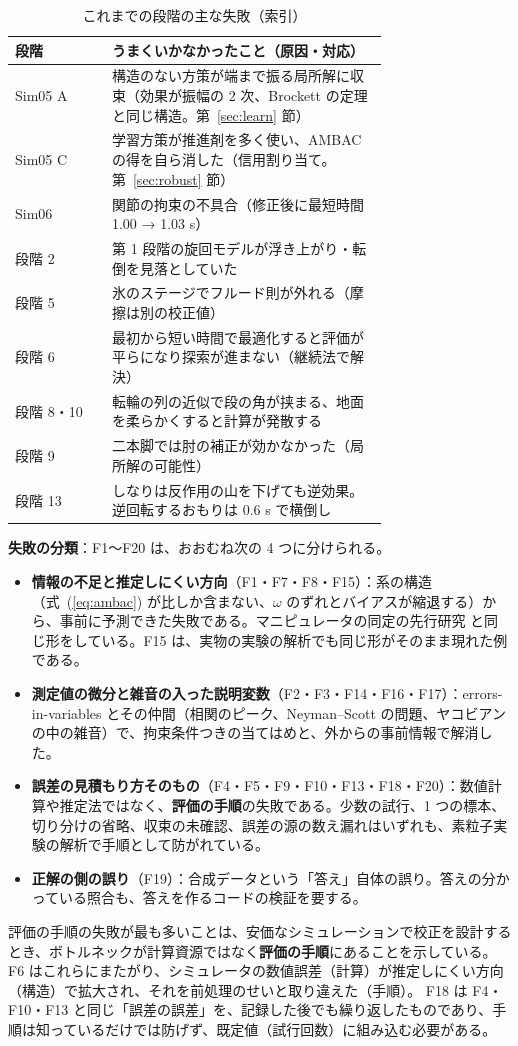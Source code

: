 \documentclass[paper=a4paper,fontsize=10pt,twocolumn,column_gap=2zw,line_length=24zw,number_of_lines=46,head_space=20mm]{jlreq}
\begin{document}
\begin{table}[t]\centering\footnotesize
\caption{これまでの段階の主な失敗（索引）}\label{tab:failidx}
\setlength{\tabcolsep}{2pt}
\begin{tabular}{lp{0.74\linewidth}}\toprule
段階 & うまくいかなかったこと（原因・対応） \\\midrule
Sim05 A & 構造のない方策が端まで振る局所解に収束（効果が振幅の 2 次、Brockett の定理と同じ構造。第~\ref{sec:learn} 節） \\
Sim05 C & 学習方策が推進剤を多く使い、AMBAC の得を自ら消した（信用割り当て。第~\ref{sec:robust} 節） \\
Sim06 & 関節の拘束の不具合（修正後に最短時間 1.00 → 1.03 s） \\
段階 2 & 第 1 段階の旋回モデルが浮き上がり・転倒を見落としていた \\
段階 5 & 氷のステージでフルード則が外れる（摩擦は別の校正値） \\
段階 6 & 最初から短い時間で最適化すると評価が平らになり探索が進まない（継続法で解決） \\
段階 8・10 & 転輪の列の近似で段の角が挟まる、地面を柔らかくすると計算が発散する \\
段階 9 & 二本脚では肘の補正が効かなかった（局所解の可能性） \\
段階 13 & しなりは反作用の山を下げても逆効果。逆回転するおもりは 0.6 s で横倒し \\\bottomrule
\end{tabular}
\end{table}

\textbf{失敗の分類}：F1〜F20 は、おおむね次の 4 つに分けられる。
\begin{itemize}\setlength{\itemsep}{0pt}
\item \textbf{情報の不足と推定しにくい方向}（F1・F7・F8・F15）：系の構造（式~(\ref{eq:ambac}) が比しか含まない、$\omega$ のずれとバイアスが縮退する）から、事前に予測できた失敗である。マニピュレータの同定の先行研究 \cite{gautier1990} と同じ形をしている。F15 は、実物の実験の解析でも同じ形がそのまま現れた例である。
\item \textbf{測定値の微分と雑音の入った説明変数}（F2・F3・F14・F16・F17）：errors-in-variables とその仲間（相関のピーク、Neyman--Scott の問題、ヤコビアンの中の雑音）で、拘束条件つきの当てはめと、外からの事前情報で解消した。
\item \textbf{誤差の見積もり方そのもの}（F4・F5・F9・F10・F13・F18・F20）：数値計算や推定法ではなく、\textbf{評価の手順}の失敗である。少数の試行、1 つの標本、切り分けの省略、収束の未確認、誤差の源の数え漏れはいずれも、素粒子実験の解析で手順として防がれている。
\item \textbf{正解の側の誤り}（F19）：合成データという「答え」自体の誤り。答えの分かっている照合も、答えを作るコードの検証を要する。
\end{itemize}
評価の手順の失敗が最も多いことは、安価なシミュレーションで校正を設計するとき、ボトルネックが計算資源ではなく\textbf{評価の手順}にあることを示している。
F6 はこれらにまたがり、シミュレータの数値誤差（計算）が推定しにくい方向（構造）で拡大され、それを前処理のせいと取り違えた（手順）。
F18 は F4・F10・F13 と同じ「誤差の誤差」を、記録した後でも繰り返したものであり、手順は知っているだけでは防げず、既定値（試行回数）に組み込む必要がある。
\end{document}
